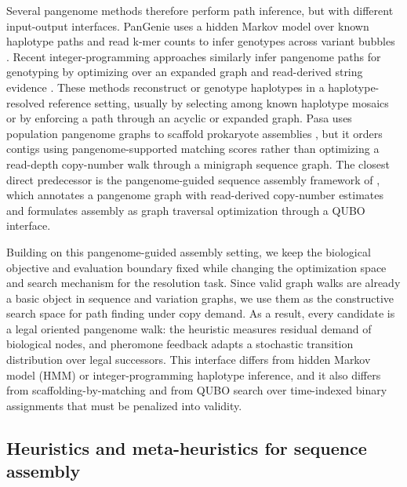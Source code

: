 \documentclass[11pt]{article}
\begin{document}
Several pangenome methods therefore perform path inference, but with different input-output interfaces. PanGenie uses a hidden Markov model over known haplotype paths and read k-mer counts to infer genotypes across variant bubbles \citep{ebler2022pangenie}. Recent integer-programming approaches similarly infer pangenome paths for genotyping by optimizing over an expanded graph and read-derived string evidence \citep{chandra2024phi}. These methods reconstruct or genotype haplotypes in a haplotype-resolved reference setting, usually by selecting among known haplotype mosaics or by enforcing a path through an acyclic or expanded graph. Pasa uses population pangenome graphs to scaffold prokaryote assemblies \citep{do2024pasa}, but it orders contigs using pangenome-supported matching scores rather than optimizing a read-depth copy-number walk through a minigraph sequence graph. The closest direct predecessor is the pangenome-guided sequence assembly framework of \citet{cudby2026pangenome}, which annotates a pangenome graph with read-derived copy-number estimates and formulates assembly as graph traversal optimization through a QUBO interface.

Building on this pangenome-guided assembly setting, we keep the biological objective and evaluation boundary fixed while changing the optimization space and search mechanism for the resolution task. Since valid graph walks are already a basic object in sequence and variation graphs, we use them as the constructive search space for path finding under copy demand. As a result, every candidate is a legal oriented pangenome walk: the heuristic measures residual demand of biological nodes, and pheromone feedback adapts a stochastic transition distribution over legal successors. This interface differs from hidden Markov model (HMM) or integer-programming haplotype inference, and it also differs from scaffolding-by-matching and from QUBO search over time-indexed binary assignments that must be penalized into validity.

\subsection{Heuristics and meta-heuristics for sequence assembly}
\end{document}
